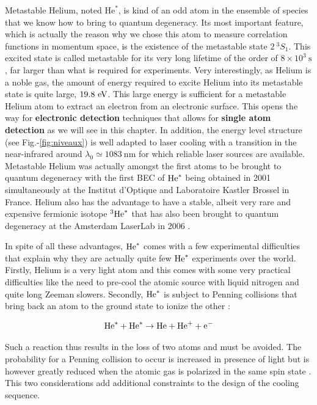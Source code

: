 Metastable Helium, noted $\mathrm{He}^*$, is kind of an odd atom in the ensemble of species that we know how to bring to quantum degeneracy. Its most important feature, which is actually the reason why we chose this atom to measure correlation functions in momentum space, is the existence of the metastable state $2 \ ^3 S_1$. This excited state is called metastable for its very long lifetime of the order of $8 \times 10^3 \ \mathrm{s}$, far larger than what is required for experiments. Very interestingly, as Helium is a noble gas, the amount of energy required to excite Helium into its metastable state is quite large, $19.8 \ \rm{eV}$. This large energy is sufficient for a metastable Helium atom to extract an electron from an electronic surface. This opens the way for \textbf{electronic detection} techniques that allows for \textbf{single atom detection} as we will see in this chapter. In addition, the energy level structure (see Fig.-\ref{fig:niveaux}) is well adapted to laser cooling with a transition in the near-infrared around $\lambda_0 \simeq 1083 \ \mathrm{nm}$ for which reliable laser sources are available. Metastable Helium was actually amongst the first atoms to be brought to quantum degeneracy with the first BEC of $\mathrm{He}^*$ being obtained in 2001 simultaneously at the Institut d'Optique \cite{robert2001bose} and Laboratoire Kastler Brossel \cite{dos2001bose} in France. Helium also has the advantage to have a stable, albeit very rare and expensive fermionic isotope $^3 \mathrm{He}^*$ that has also been brought to quantum degeneracy at the Amsterdam LaserLab in 2006 \cite{mcnamara2006degenerate}.

In spite of all these advantages, $\mathrm{He}^*$ comes with a few experimental difficulties that explain why they are actually quite few $\mathrm{He}^*$ experiments over the world. Firstly, Helium is a very light atom and this comes with some very practical difficulties like the need to pre-cool the atomic source with liquid nitrogen and quite long Zeeman slowers. Secondly, $\mathrm{He}^*$ is subject to Penning collisions that bring back an atom to the ground state to ionize the other \cite{dos2001penning}:

\begin{equation}
    \mathrm{He}^* + \mathrm{He}^* \rightarrow \mathrm{He} + \mathrm{He}^+ + \mathrm{e}^{-}
\end{equation}

\noindent Such a reaction thus results in the loss of two atoms and must be avoided. The probability for a Penning collision to occur is increased in presence of light \cite{bardou1992magneto} but is however greatly reduced when the atomic gas is polarized in the same spin state \cite{fedichev1996inelastic}. This two considerations add additional constraints to the design of the cooling sequence.




